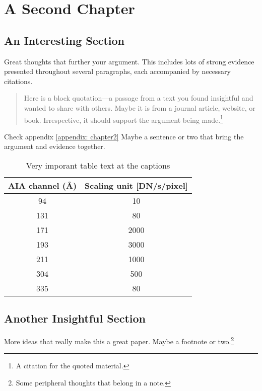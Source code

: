 \chapter{A Second Chapter}
\label{chapter:two}


\section{An Interesting Section}

Great thoughts that further your argument. This includes lots of strong evidence presented throughout several paragraphs, each accompanied by necessary citations.
\begin{quotation}
    \noindent Here is a block quotation---a passage from a text you found insightful and wanted to share with others. Maybe it is from a journal article, website, or book. Irrespective, it should support the argument being made.\footnote{A citation for the quoted material.}
\end{quotation}

Check appendix \ref{appendix: chapter2}
Maybe a sentence or two that bring the argument and evidence together.\citep{dos_santos_2020}

\begin{table}[h!]
  \centering
  \caption[Very important table text at the list of Tables]{Very imporant table text at the captions}
  \label{tab:average_channels}
  \begin{tabular}{cc}
    \toprule
     AIA channel (\AA) &  Scaling unit [DN/s/pixel] \\
     \midrule
      94 &   10  \\
      131 &   80  \\
      171 & 2000  \\
      193 & 3000  \\
      211 & 1000  \\
      304 &  500  \\
      335 &   80  \\
      \bottomrule
  \end{tabular}
\end{table}


\section{Another Insightful Section}

More ideas that really make this a great paper. Maybe a footnote or two.\footnote{Some peripheral thoughts that belong in a note.}
